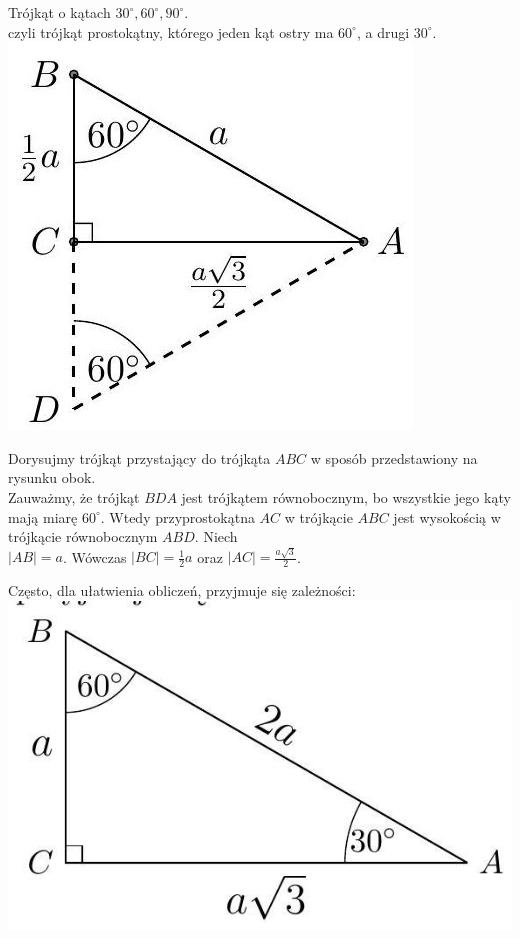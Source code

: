 \documentclass[10pt]{article}
\begin{document}
Trójkąt o kątach \(30^{\circ}, 60^{\circ}, 90^{\circ}\).\\
czyli trójkąt prostokątny, którego jeden kąt ostry ma \(60^{\circ}\), a drugi \(30^{\circ}\).\\
\includegraphics[max width=\textwidth, center]{2024_11_21_71f62bd117d375398909g-133(1)}

Dorysujmy trójkąt przystający do trójkąta \(A B C\) w sposób przedstawiony na rysunku obok.\\
Zauważmy, że trójkąt \(B D A\) jest trójkątem równobocznym, bo wszystkie jego kąty mają miarę \(60^{\circ}\). Wtedy przyprostokątna \(A C\) w trójkącie \(A B C\) jest wysokością w trójkącie równobocznym \(A B D\). Niech\\
\(|A B|=a\). Wówczas \(|B C|=\frac{1}{2} a\) oraz \(|A C|=\frac{a \sqrt{3}}{2}\).

Często, dla ułatwienia obliczeń, przyjmuje się zależności:\\
\includegraphics[max width=\textwidth, center]{2024_11_21_71f62bd117d375398909g-133(2)}
\end{document}

